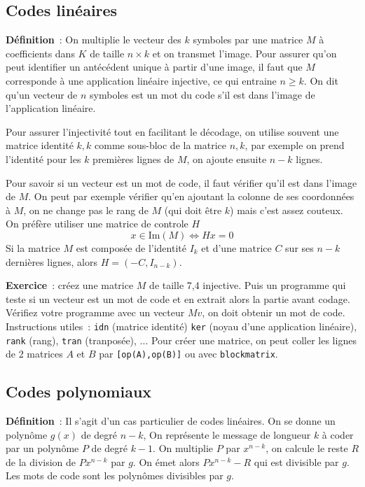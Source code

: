 \documentclass[a4paper,11pt]{book}
\begin{document}
\begin{giacjshere}
\subsection{Codes lin\'eaires}
{\bf D\'efinition}~:
On multiplie le vecteur des $k$ symboles par
une matrice $M$ à coefficients dans $K$ de taille $n \times k$
et on transmet l'image.
Pour assurer qu'on peut identifier un antécédent
unique à partir d'une image, il faut que $M$ corresponde 
à une application linéaire injective, ce qui entraine $n\geq k$. 
On dit qu'un vecteur de $n$ symboles est un mot du code 
s'il est dans l'image de l'application lin\'eaire.

Pour assurer l'injectivité tout en facilitant le décodage, 
on utilise souvent une matrice identité $k,k$ comme sous-bloc
de la matrice $n,k$, par exemple on prend l'identité pour
les $k$ premières lignes de $M$, on ajoute ensuite $n-k$ lignes.

Pour savoir si un vecteur est un mot de code, il faut vérifier
qu'il est dans l'image de $M$. On peut par exemple vérifier
qu'en ajoutant la colonne de ses coordonnées à $M$, on ne change
pas le rang de $M$ (qui doit être $k$) mais c'est assez couteux.
On pr\'ef\`ere utiliser une matrice de controle $H$
$$ x \in \mbox{Im}(M) \Leftrightarrow Hx=0$$
Si la matrice $M$ est compos\'ee de l'identit\'e $I_{k}$
et d'une matrice $C$ sur ses $n-k$ derni\`eres lignes, 
alors $H=(-C,I_{n-k})$.

{\bf Exercice}~: créez une matrice $M$ de taille 7,4 injective. Puis
un programme qui teste si un vecteur est un mot de code et en
extrait alors la partie avant codage. Vérifiez votre programme
avec un vecteur $Mv$, on doit obtenir un mot de code.\\
Instructions utiles~: \verb|idn| (matrice identité)
\verb|ker| (noyau d'une application linéaire), \verb|rank| (rang),
\verb|tran| (tranposée), ... Pour créer une matrice, on peut coller
les lignes de 2 matrices $A$ et $B$ par \verb|[op(A),op(B)]| ou avec
\verb|blockmatrix|.

\subsection{Codes polynomiaux}
{\bf Définition}~:
Il s'agit d'un cas particulier de codes lin\'eaires.
On se donne un polyn\^ome $g(x)$ de degr\'e $n-k$,
On repr\'esente le message de longueur $k$ \`a coder par un polyn\^ome 
$P$ de degr\'e $k-1$.
On multiplie $P$ par $x^{n-k}$, on calcule le reste $R$ de la division
de $P x^{n-k}$ par $g$. On \'emet alors $P x^{n-k}-R$ qui est divisible
par $g$. Les mots de code sont les polyn\^omes divisibles par $g$.


\end{giacjshere}
\end{document}
